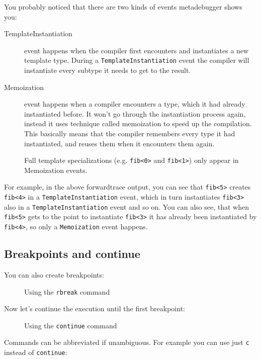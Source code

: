 You probably noticed that there are two kinds of events metadebugger shows you:

\begin{description}
    \item[TemplateInstantiation] event happens when the compiler first
        encounters and instantiates a new template type. During a
        \texttt{TemplateInstantiation} event the compiler will instantiate
        every subtype it needs to get to the result.
    \item[Memoization] event happens when a compiler encounters a type, which
        it had already instantiated before. It won't go through the
        instantiation process again, instead it uses technique called
        memoization to speed up the compilation. This basically means that the
        compiler remembers every type it had instantiated, and reuses them when
        it encounters them again.

        Full template specializations (e.g. \texttt{fib<0>} and
        \texttt{fib<1>}) only appear in Memoization events.
\end{description}

For example, in the above forwardtrace output, you can see that \texttt{fib<5>}
creates \texttt{fib<4>} in a \texttt{TemplateInstantiation} event, which in
turn instantiates \texttt{fib<3>} also in a \texttt{TemplateInstantiation}
event and so on.  You can also see, that when \texttt{fib<5>} gets to the point
to instantiate \texttt{fib<3>} it has already been instantiated by
\texttt{fib<4>}, so only a \texttt{Memoization} event happens.

\subsection{Breakpoints and continue}

You can also create breakpoints:

\begin{figure}[H]
    
    \caption{Using the \texttt{rbreak} command}
\end{figure}

\noindent
Now let's continue the execution until the first breakpoint:

\noindent
\begin{figure}[H]
    
    \caption{Using the \texttt{continue} command}
\end{figure}

\noindent
Commands can be abbreviated if unambiguous. For example you can use just
\texttt{c} instead of \texttt{continue}:

